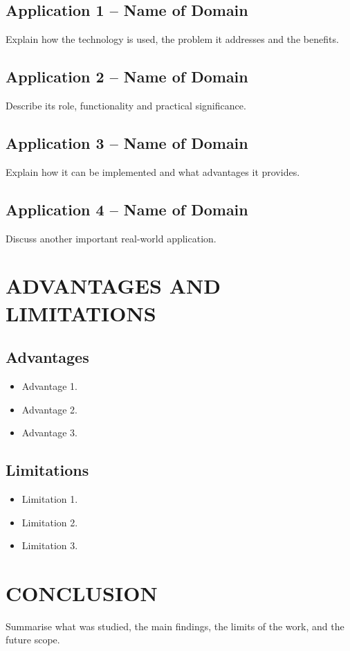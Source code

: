\documentclass[12pt,a4paper]{report}
\begin{document}
\section{Application 1 -- Name of Domain}
Explain how the technology is used, the problem it addresses and the benefits.

\section{Application 2 -- Name of Domain}
Describe its role, functionality and practical significance.

\section{Application 3 -- Name of Domain}
Explain how it can be implemented and what advantages it provides.

\section{Application 4 -- Name of Domain}
Discuss another important real-world application.

\chapter{ADVANTAGES AND LIMITATIONS}
\section{Advantages}
\begin{itemize}[leftmargin=*]
  \item Advantage 1.
  \item Advantage 2.
  \item Advantage 3.
\end{itemize}
\section{Limitations}
\begin{itemize}[leftmargin=*]
  \item Limitation 1.
  \item Limitation 2.
  \item Limitation 3.
\end{itemize}

\chapter{CONCLUSION}
Summarise what was studied, the main findings, the limits of the work, and the future scope.
\end{document}

